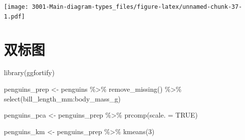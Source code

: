 \documentclass[
]{book}
\newenvironment{Shaded}{\begin{snugshade}}{\end{snugshade}}
\newcommand{\AttributeTok}[1]{\textcolor[rgb]{0.77,0.63,0.00}{#1}}
\newcommand{\ConstantTok}[1]{\textcolor[rgb]{0.00,0.00,0.00}{#1}}
\newcommand{\DecValTok}[1]{\textcolor[rgb]{0.00,0.00,0.81}{#1}}
\newcommand{\FunctionTok}[1]{\textcolor[rgb]{0.00,0.00,0.00}{#1}}
\newcommand{\NormalTok}[1]{#1}
\newcommand{\OtherTok}[1]{\textcolor[rgb]{0.56,0.35,0.01}{#1}}
\newcommand{\SpecialCharTok}[1]{\textcolor[rgb]{0.00,0.00,0.00}{#1}}
\begin{document}
\texttt{[image: 3001-Main-diagram-types\_files/figure-latex/unnamed-chunk-37-1.pdf]}

\hypertarget{ux53ccux6807ux56fe}{%
\section{双标图}\label{ux53ccux6807ux56fe}}

\begin{Shaded}
\begin{Highlighting}[]
\FunctionTok{library}\NormalTok{(ggfortify)}
\end{Highlighting}
\end{Shaded}

\begin{Shaded}
\begin{Highlighting}[]
\NormalTok{penguins\_prep }\OtherTok{\textless{}{-}}\NormalTok{ penguins }\SpecialCharTok{\%\textgreater{}\%}
  \FunctionTok{remove\_missing}\NormalTok{() }\SpecialCharTok{\%\textgreater{}\%}
  \FunctionTok{select}\NormalTok{(bill\_length\_mm}\SpecialCharTok{:}\NormalTok{body\_mass\_g)}

\NormalTok{penguins\_pca }\OtherTok{\textless{}{-}}\NormalTok{ penguins\_prep }\SpecialCharTok{\%\textgreater{}\%}
  \FunctionTok{prcomp}\NormalTok{(}\AttributeTok{scale. =} \ConstantTok{TRUE}\NormalTok{)}
\end{Highlighting}
\end{Shaded}

\begin{Shaded}
\begin{Highlighting}[]
\NormalTok{penguins\_km }\OtherTok{\textless{}{-}}\NormalTok{ penguins\_prep }\SpecialCharTok{\%\textgreater{}\%}
  \FunctionTok{kmeans}\NormalTok{(}\DecValTok{3}\NormalTok{)}
\end{Highlighting}
\end{Shaded}
\end{document}
